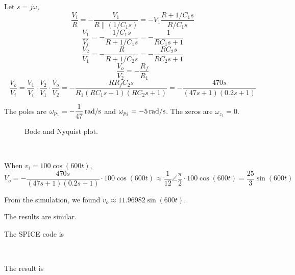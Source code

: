 \documentclass{article}
\newcommand{\inputmintedindent}[2]{
\begin{minipage}{0.1\linewidth}\end{minipage}
\begin{minipage}{0.85\linewidth}\inputminted{#1}{#2}\end{minipage}\\[0.5em]
}
\newcommand{\unit}[1]{{\rm\,#1}}
\begin{document}
\section{}
Let $s=j\omega$,
$$\frac{V_i}{R}=-\frac{V_1}{R\parallel(1/C_1s)}=-V_1\frac{R+1/C_1s}{R/C_1s}$$
$$\frac{V_1}{V_i}=-\frac{1/C_1s}{R+1/C_1s}=-\frac{1}{RC_1s+1}$$
$$\frac{V_2}{V_1}=-\frac{R}{R+1/C_2s}=-\frac{RC_2s}{RC_2s+1}$$
$$\frac{V_o}{V_2}=-\frac{R_f}{R_1}$$
$$\frac{V_o}{V_i}=\frac{V_1}{V_i}\cdot\frac{V_2}{V_1}\cdot\frac{V_o}{V_2}=-\frac{RR_fC_2s}{R_1(RC_1s+1)(RC_2s+1)}=-\frac{470s}{(47s+1)(0.2s+1)}$$

The poles are $\omega_{p_1}=-\dfrac{1}{47}\unit{rad/s}$ and $\omega_{p_2}=-5\unit{rad/s}$. The zeros are $\omega_{z_1}=0$.

\begin{figure}[!htbp]
	\centering
	\caption{Bode and Nyquist plot.}
\end{figure}

\inputmintedindent{matlab}{p3.m}

When $v_i=100\cos(600t)$, $$V_o=-\frac{470s}{(47s+1)(0.2s+1)}\cdot100\cos(600t)\approx\frac{1}{12}\angle\frac{\pi}{2}\cdot100\cos(600t)=\frac{25}{3}\sin(600t)$$

From the simulation, we found $v_o\approx11.96982\sin(600t)$.

The results are similar.

The SPICE code is \\

\inputmintedindent{v}{p3.cir}

The result is \\

\inputmintedindent{v}{p3.result2}
\end{document}
